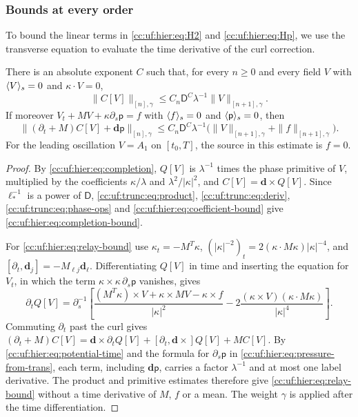 \subsubsection{Bounds at every order}

To bound the linear terms in \eqref{cc:uf:hier:eq:H2} and
\eqref{cc:uf:hier:eq:Hp}, we use the transverse equation to evaluate
the time derivative of the curl correction.
\begin{lemma}\label{cc:uf:hier:lem:relay}
There is an absolute exponent $C$ such that, for every \(n\ge0\) and
every field $V$ with $\langle V\rangle_s=0$ and $\kappa\cdot V=0$,
\begin{equation}\label{cc:uf:hier:eq:completion-bound}
 \|C[V]\|_{[n],\gamma}\le C_n\mathsf D^C\lambda^{-1}\|V\|_{[n+1],\gamma}.
\end{equation}
If moreover \(V_t+MV+\kappa\partial_s\mathsf p=f\) with $\langle f\rangle_s=0$ and
$\langle \mathsf p\rangle_s=0$, then
\begin{equation}\label{cc:uf:hier:eq:relay-bound}
 \|(\partial_t+M)C[V]+\mathbf d\mathsf p\|_{[n],\gamma}
 \le C_n\mathsf D^C\lambda^{-1}
             \bigl(\|V\|_{[n+1],\gamma}+\|f\|_{[n+1],\gamma}\bigr).
\end{equation}
For the leading oscillation $V=A_1$ on $[t_0,T]$, the source in this estimate is
$f=0$.
\end{lemma}
\begin{proof}
By \eqref{cc:uf:hier:eq:completion}, $Q[V]$ is $\lambda^{-1}$ times the
phase primitive of $V$, multiplied by the coefficients $\kappa/\lambda$
and $\lambda^2/|\kappa|^2$, and $C[V]=\mathbf d\times Q[V]$.
Since $\ell_*^{-1}$ is a power of $\mathsf D$,
\eqref{cc:uf:trunc:eq:product}, \eqref{cc:uf:trunc:eq:deriv},
\eqref{cc:uf:trunc:eq:phase-ops} and
\eqref{cc:uf:hier:eq:coefficient-bound} give
\eqref{cc:uf:hier:eq:completion-bound}.

For \eqref{cc:uf:hier:eq:relay-bound} use \(\kappa_t=-M^T\kappa\),
\((|\kappa|^{-2})_t=2(\kappa\cdot M\kappa)|\kappa|^{-4}\),
and \([\partial_t,\mathbf d_j]=-M_{\ell j}\mathbf d_\ell\).
Differentiating $Q[V]$ in time and inserting the equation for $V_t$, in
which the term \(\kappa\times\kappa\,\partial_s\mathsf p\) vanishes, gives
\begin{equation}\label{cc:uf:hier:eq:potential-time}
 \partial_tQ[V]=\partial_s^{-1}\left[
  \frac{(M^T\kappa)\times V+\kappa\times MV-\kappa\times f}
       {|\kappa|^2}
  -2\frac{(\kappa\times V)(\kappa\cdot M\kappa)}
             {|\kappa|^4}\right].
\end{equation}
Commuting $\partial_t$ past the curl gives
$(\partial_t+M)C[V]=\mathbf d\times\partial_tQ[V]
+[\partial_t,\mathbf d\times]Q[V]+MC[V]$.
By \eqref{cc:uf:hier:eq:potential-time} and the formula for
$\partial_s\mathsf p$ in \eqref{cc:uf:hier:eq:pressure-from-trans},
each term, including $\mathbf d\mathsf p$, carries a factor $\lambda^{-1}$
and at most one label derivative. The product and primitive estimates
therefore give \eqref{cc:uf:hier:eq:relay-bound} without a time derivative
of $M$, $f$ or a mean. The weight $\gamma$ is applied after the time
differentiation.
\end{proof}

